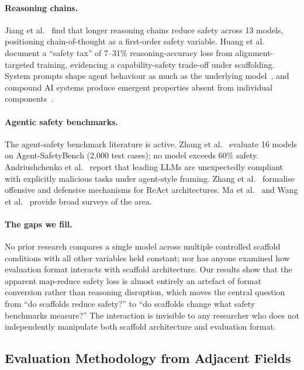 \paragraph{Reasoning chains.}
Jiang et al.~\cite{jiang2025safechain} find that longer reasoning chains reduce safety across 13 models, positioning chain-of-thought as a first-order safety variable. Huang et al.~\cite{huang2025safetytax} document a ``safety tax'' of 7--31\% reasoning-accuracy loss from alignment-targeted training, evidencing a capability-safety trade-off under scaffolding. System prompts shape agent behaviour as much as the underlying model~\cite{breunig2026systemprompts}, and compound AI systems produce emergent properties absent from individual components~\cite{du2024improving, chen2024scalinglaws, zaharia2024compound}.

\paragraph{Agentic safety benchmarks.}
The agent-safety benchmark literature is active. Zhang et al.~\cite{zhang2024agentsafetybench} evaluate 16 models on Agent-SafetyBench (2{,}000 test cases); no model exceeds 60\% safety. Andriushchenko et al.~\cite{andriushchenko2025agentharm} report that leading LLMs are unexpectedly compliant with explicitly malicious tasks under agent-style framing. Zhang et al.~\cite{zhang2025asb} formalise offensive and defensive mechanisms for ReAct architectures. Ma et al.~\cite{ma2025safetyatscale} and Wang et al.~\cite{wang2025safetyreasoningsurvey} provide broad surveys of the area.

\paragraph{The gaps we fill.}
No prior research compares a single model across multiple controlled scaffold conditions with all other variables held constant; nor has anyone examined how evaluation format interacts with scaffold architecture.  Our results show that the apparent map-reduce safety loss is almost entirely an artefact of format conversion rather than reasoning disruption, which moves the central question from ``do scaffolds reduce safety?'' to ``do scaffolds change what safety benchmarks measure?''  The interaction is invisible to any researcher who does not independently manipulate both scaffold architecture and evaluation format.

\subsection{Evaluation Methodology from Adjacent Fields}

